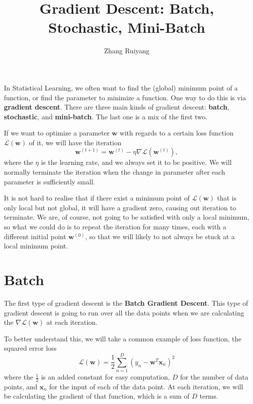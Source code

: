 \documentclass{article}
\title{Gradient Descent: Batch, Stochastic, Mini-Batch}
\author{Zhang Ruiyang}
\date{}
\theoremstyle{definition}
\def\L{\mathcal{L}}
\begin{document}
\maketitle

\noindent In Statistical Learning, we often want to find the (global) minimum point of a function, or find the parameter to minimize a function. One way to do this is via \textbf{gradient descent}. There are three main kinds of gradient descent: \textbf{batch}, \textbf{stochastic}, and \textbf{mini-batch}. The last one is a mix of the first two.

\bigskip

\noindent If we want to optimize a parameter $\textbf{w}$ with regards to a certain loss function $\L(\textbf{w})$ of it, we will have the iteration 
\begin{equation*}
\textbf{w}^{(t+1)} = \textbf{w}^{(t)} - \eta \nabla \L(\textbf{w}^{(t)}),
\end{equation*}
\noindent where the $\eta$ is the learning rate, and we always set it to be positive. We will normally terminate the iteration when the change in parameter after each parameter is sufficiently small.

\bigskip

\noindent It is not hard to realise that if there exist a minimum point of $\L(\textbf{w})$ that is only local but not global, it will have a gradient zero, causing out iteration to terminate. We are, of course, not going to be satisfied with only a local minimum, so what we could do is to repeat the iteration for many times, each with a different initial point $\textbf{w}^{(0)}$, so that we will likely to not always be stuck at a local minimum point. 

\section{Batch}

\noindent The first type of gradient descent is the \textbf{Batch Gradient Descent}. This type of gradient descent is going to run over all the data points when we are calculating the $\nabla \L(\textbf{w})$ at each iteration. 

\bigskip

\noindent To better understand this, we will take a common example of loss function, the squared error loss 
\begin{equation*}
\L(\textbf{w}) = \frac{1}{2} \sum_{n=1}^{D} (y_n - \textbf{w}^{T}\textbf{x}_n)^2
\end{equation*}
\noindent where the $\frac{1}{2}$ is an added constant for easy computation, $D$ for the number of data points, and $\textbf{x}_n$ for the input of each of the data point. At each iteration, we will be calculating the gradient of that function, which is a sum of $D$ terms.
\end{document}
